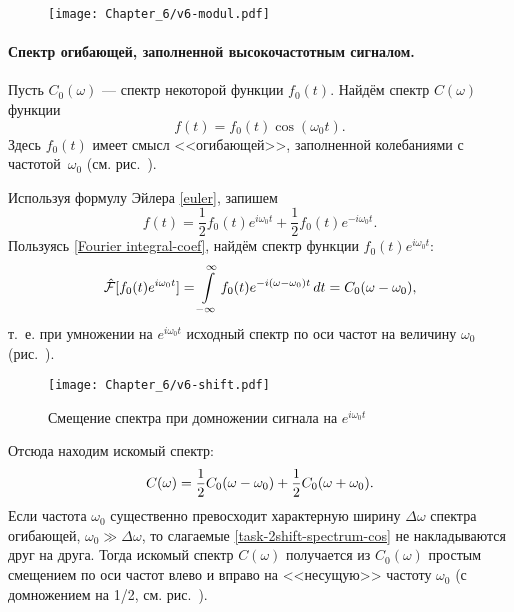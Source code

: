 \begin{wrapfigure}{o}{0.3\textwidth}
 \centering\texttt{[image: Chapter\_6/v6-modul.pdf]}
 \caption{}
\end{wrapfigure}

\paragraph{Спектр огибающей, заполненной высокочастотным сигналом.}
Пусть $C_0(\omega)$ --- спектр некоторой функции $f_0(t)$.
Найдём спектр $C(\omega)$ функции
\begin{equation*}
f(t)=f_0(t)\cos(\omega_0 t).
\end{equation*}
Здесь $f_0(t)$ имеет смысл <<огибающей>>, заполненной колебаниями
с частотой~$\omega_0$ (см. рис.~).

Используя формулу Эйлера \eqref{euler}, запишем
\begin{equation*}
    f(t)=\frac{1}{2}f_0(t)e^{i\omega_0t}+\frac{1}{2}f_0(t)e^{-i\omega_0t}.
\end{equation*}
Пользуясь \eqref{Fourier integral-coef}, найдём спектр
функции $f_0(t)e^{i\omega_0 t}$:
\begin{equation}
    \eqmark{task-spectrum-shift}
    \hat{\mathcal{F}}[f_0(t)e^{i\omega_0 t}]=
\int\limits_{-\infty}^\infty
f_0(t)e^{-i(\omega-\omega_0)t}\,dt=C_0(\omega-\omega_0),
\end{equation}
т.~е. при умножении на $e^{i\omega_0 t}$ исходный спектр
 по оси частот на величину $\omega_0$
(рис.~).

\begin{figure}[h!]
\centering\texttt{[image: Chapter\_6/v6-shift.pdf]}
\caption{Смещение спектра при домножении сигнала на $e^{i\omega_0 t}$}
\end{figure}

%

Отсюда находим искомый спектр:
\begin{equation}
    \eqmark{task-2shift-spectrum-cos}
    C(\omega)=\frac{1}{2}C_0(\omega-\omega_0)+\frac{1}{2}C_0(\omega+\omega_0).
\end{equation}
Если частота $\omega_0$ существенно превосходит характерную ширину $\Delta \omega$
спектра огибающей, $\omega_0 \gg \Delta \omega$, то слагаемые
\eqref{task-2shift-spectrum-cos} не накладываются друг на друга.
Тогда искомый спектр $C(\omega)$ получается из $C_0(\omega)$
простым смещением по оси частот влево и вправо на <<несущую>>
частоту $\omega_0$ (с домножением на 1/2, см. рис.~).

